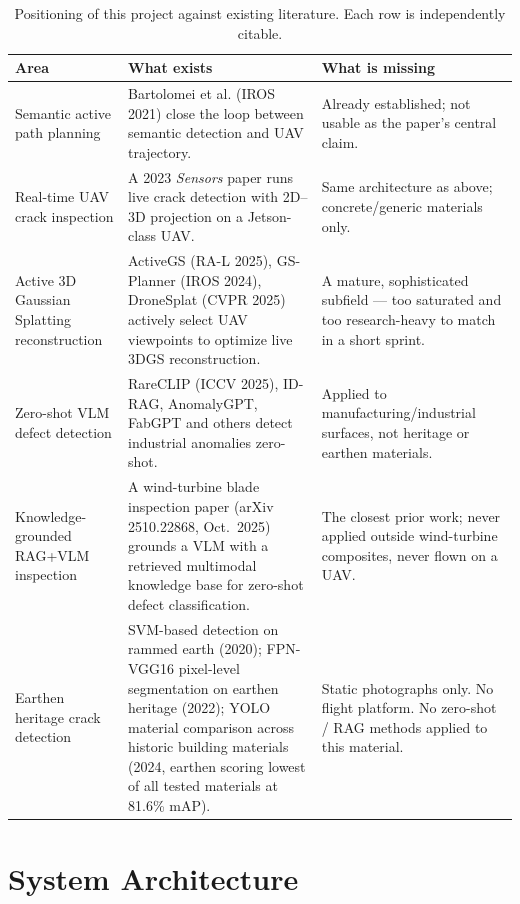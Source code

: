 \documentclass[11pt,a4paper]{article}
\begin{document}
\begin{table}[h!]
\centering
\small
\begin{tabular}{p{2.6cm} p{6.3cm} p{4.6cm}}
\toprule
\textbf{Area} & \textbf{What exists} & \textbf{What is missing} \\
\midrule
Semantic active path planning & Bartolomei et al. (IROS 2021) close the loop between semantic detection and UAV trajectory. & Already established; not usable as the paper's central claim. \\
\addlinespace
Real-time UAV crack inspection & A 2023 \emph{Sensors} paper runs live crack detection with 2D--3D projection on a Jetson-class UAV. & Same architecture as above; concrete/generic materials only. \\
\addlinespace
Active 3D Gaussian Splatting reconstruction & ActiveGS (RA-L 2025), GS-Planner (IROS 2024), DroneSplat (CVPR 2025) actively select UAV viewpoints to optimize live 3DGS reconstruction. & A mature, sophisticated subfield --- too saturated and too research-heavy to match in a short sprint. \\
\addlinespace
Zero-shot VLM defect detection & RareCLIP (ICCV 2025), ID-RAG, AnomalyGPT, FabGPT and others detect industrial anomalies zero-shot. & Applied to manufacturing/industrial surfaces, not heritage or earthen materials. \\
\addlinespace
Knowledge-grounded RAG+VLM inspection & A wind-turbine blade inspection paper (arXiv 2510.22868, Oct.\ 2025) grounds a VLM with a retrieved multimodal knowledge base for zero-shot defect classification. & The closest prior work; never applied outside wind-turbine composites, never flown on a UAV. \\
\addlinespace
Earthen heritage crack detection & SVM-based detection on rammed earth (2020); FPN-VGG16 pixel-level segmentation on earthen heritage (2022); YOLO material comparison across historic building materials (2024, earthen scoring lowest of all tested materials at 81.6\% mAP). & Static photographs only. No flight platform. No zero-shot / RAG methods applied to this material. \\
\bottomrule
\end{tabular}
\caption{Positioning of this project against existing literature. Each row is independently citable.}
\label{tab:relatedwork}
\end{table}

\section{System Architecture}
\end{document}
